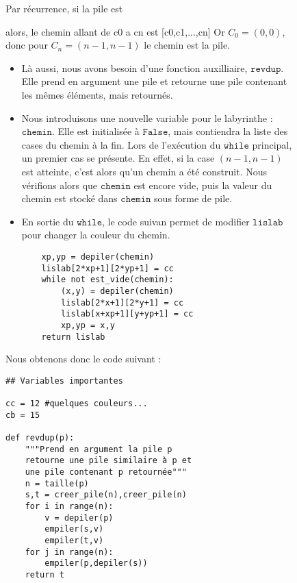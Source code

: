 \documentclass[11pt,a4paper]{article}
\begin{document}
\begin{figure}
\par 
Par récurrence, si la pile est
alors, le chemin allant de c0 a cn est [c0,c1,...,cn] Or $C_0 = (0,0)$, donc pour $C_n = (n-1,n-1)$ le chemin est la pile.
\begin{itemize}
	\item Là aussi, nous avons besoin d'une fonction auxilliaire, $\mathtt{revdup}$. Elle prend en argument une pile et retourne une pile contenant les mêmes éléments, mais retournés.
	\item Nous introduisons une nouvelle variable pour le labyrinthe : $\mathtt{chemin}$. Elle est initialisée à $\mathtt{False}$, mais contiendra la liste des cases du chemin à la fin. Lors de l'exécution du $\mathtt{while}$ principal, un premier cas se présente. En effet, si la case $(n-1,n-1)$ est atteinte, c'est alors qu'un chemin a été construit. Nous vérifions alors que $\mathtt{chemin}$ est encore vide, puis la valeur du chemin est stocké dans $\mathtt{chemin}$ sous forme de pile.
	\item En sortie du $\mathtt{while}$, le code suivan permet de modifier $\mathtt{lislab}$ pour changer la couleur du chemin.
\begin{lstlisting}
	xp,yp = depiler(chemin)
    lislab[2*xp+1][2*yp+1] = cc
    while not est_vide(chemin):
        (x,y) = depiler(chemin)
        lislab[2*x+1][2*y+1] = cc
        lislab[x+xp+1][y+yp+1] = cc
        xp,yp = x,y
    return lislab
\end{lstlisting}
\end{itemize}
Nous obtenons donc le code suivant :
\begin{lstlisting}
## Variables importantes

cc = 12 #quelques couleurs...
cb = 15

def revdup(p):
    """Prend en argument la pile p
    retourne une pile similaire à p et
    une pile contenant p retournée"""
    n = taille(p)
    s,t = creer_pile(n),creer_pile(n)
    for i in range(n):
        v = depiler(p)
        empiler(s,v)
        empiler(t,v)
    for j in range(n):
        empiler(p,depiler(s))
    return t
    

\end{lstlisting}
\end{figure}
\end{document}

